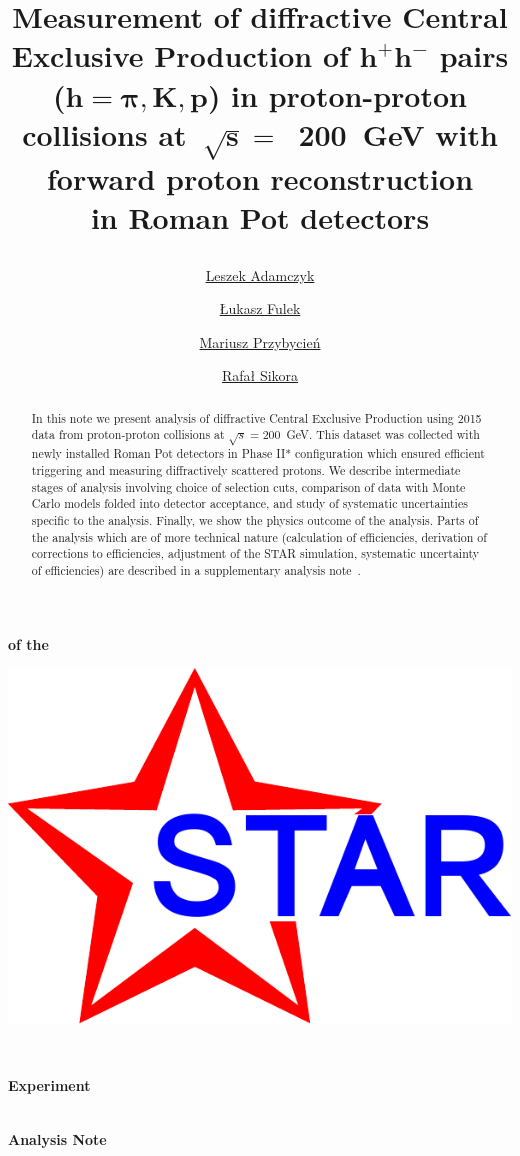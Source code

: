 \documentclass[a4paper,10pt,notitlepage]{report}
\title{%
\centering\hspace*{-0.08\linewidth}\begin{minipage}{1.16\linewidth}\centering%
\textbf{Measurement of diffractive Central Exclusive Production of $\bm{h^{+}h^{-}}$ pairs ($\bm{h=\pi,K,p}$) in proton-proton collisions at~$\bm{\sqrt{s}=}$~200~GeV with forward proton reconstruction\\in Roman Pot detectors}
\end{minipage}%
\vspace*{10pt}}
\author[ ]{\href{mailto:leszek.adamczyk@agh.edu.pl}{Leszek Adamczyk}}
\author[ ]{\href{mailto:lukasz.fulek@fis.agh.edu.pl}{Łukasz Fulek}}
\author[ ]{\href{mailto:mariusz.przybycien@agh.edu.pl}{Mariusz Przybycień}}
\author[ ]{\href{mailto:rafal.sikora@fis.agh.edu.pl}{Rafał Sikora}}
\affil[ ]{AGH University of Science and Technology, FPACS, Kraków, Poland}
\begin{document}
\begin{center}
\begin{minipage}[c]{0.12\linewidth}%
\vspace{5.5pt}\textbf{\LARGE{of the}}
\end{minipage}
\begin{minipage}[c]{0.15\linewidth}%
\hspace*{-8pt}\includegraphics[width=\linewidth]{graphics/STAR_logo.pdf}
\end{minipage}~
\begin{minipage}[c]{0.24\linewidth}%
\vspace{9pt}\hspace*{-8pt}\textbf{\LARGE{Experiment}}
\end{minipage}\\[-50pt]
\textbf{\LARGE{Analysis Note}}

\vspace*{150pt}
\begin{minipage}{\linewidth}
\maketitle
\begin{abstract}
In this note we present analysis of diffractive Central Exclusive Production using 2015 data from proton-proton collisions at $\sqrt{s}=200$~GeV. This dataset was collected with newly installed Roman Pot detectors in Phase II* configuration which ensured efficient triggering and measuring diffractively scattered protons. We describe intermediate stages of analysis involving choice of selection cuts, comparison of data with Monte Carlo models folded into detector acceptance, and study of systematic uncertainties specific to the analysis. Finally, we show the physics outcome of the analysis. Parts of the analysis which are of more technical nature (calculation of efficiencies, derivation of corrections to efficiencies, adjustment of the STAR simulation, systematic uncertainty of efficiencies) are described in a supplementary analysis note~\cite{supplementaryNote}.
\end{abstract}
\thispagestyle{empty}
\end{minipage}


\end{center}
\end{document}
